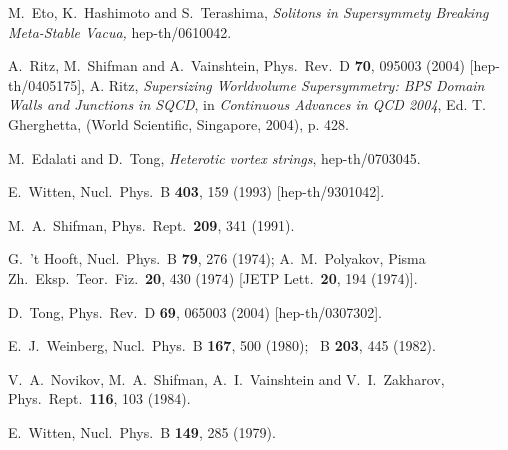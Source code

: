 \documentclass[epsfig,12pt]{article}
\begin{document}
\begin{thebibliography}{99}
M.~Eto, K.~Hashimoto and S.~Terashima,
{\em Solitons in Supersymmety Breaking Meta-Stable Vacua,}
hep-th/0610042.

A.~Ritz, M.~Shifman and A.~Vainshtein,
Phys.\ Rev.\ D {\bf 70}, 095003 (2004)
[hep-th/0405175],
A. Ritz,
{\em Supersizing Worldvolume Supersymmetry:
BPS Domain Walls and Junctions in SQCD},
in {\sl Continuous Advances in QCD 2004},
Ed. T. Gherghetta, (World Scientific, Singapore, 2004),
p. 428.

M.~Edalati and D.~Tong,
{\em Heterotic vortex strings}, hep-th/0703045.

E.~Witten,
  Nucl.\ Phys.\ B {\bf 403}, 159 (1993)
  [hep-th/9301042].
  
  M.~A.~Shifman,
  Phys.\ Rept.\  {\bf 209}, 341 (1991).
  
G.~'t Hooft,
Nucl.\ Phys.\ B {\bf 79}, 276 (1974);
A.~M.~Polyakov,
Pisma Zh.\ Eksp.\ Teor.\ Fiz.\  {\bf 20}, 430 (1974)
[JETP Lett.\  {\bf 20}, 194 (1974)].

D.~Tong,
Phys.\ Rev.\ D {\bf 69}, 065003 (2004)
[hep-th/0307302].

E.~J.~Weinberg,
Nucl.\ Phys.\ B {\bf 167}, 500 (1980);
\ B {\bf 203}, 445 (1982).

V.~A.~Novikov, M.~A.~Shifman, A.~I.~Vainshtein and
V.~I.~Zakharov,
Phys.\ Rept.\  {\bf 116}, 103 (1984).

E.~Witten,
Nucl.\ Phys.\ B {\bf 149}, 285 (1979).


\end{thebibliography}
\end{document}
